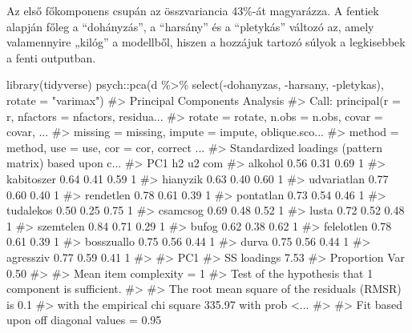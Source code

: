 \documentclass[
  letterpaper,
]{krantz}
\makeatletter
\newenvironment{Shaded}{\begin{snugshade}}{\end{snugshade}}
\newcommand{\AttributeTok}[1]{\textcolor[rgb]{0.40,0.45,0.13}{#1}}
\newcommand{\CommentTok}[1]{\textcolor[rgb]{0.37,0.37,0.37}{#1}}
\newcommand{\FunctionTok}[1]{\textcolor[rgb]{0.28,0.35,0.67}{#1}}
\newcommand{\NormalTok}[1]{\textcolor[rgb]{0.00,0.23,0.31}{#1}}
\newcommand{\SpecialCharTok}[1]{\textcolor[rgb]{0.37,0.37,0.37}{#1}}
\newcommand{\StringTok}[1]{\textcolor[rgb]{0.13,0.47,0.30}{#1}}
\newenvironment{kframe}{%
\medskip{}
\setlength{\fboxsep}{.8em}
 \def\at@end@of@kframe{}%
 \ifinner\ifhmode%
  \def\at@end@of@kframe{\end{minipage}}%
  \begin{minipage}{\columnwidth}%
 \fi\fi%
 \def\FrameCommand##1{\hskip\@totalleftmargin \hskip-\fboxsep
 \colorbox{shadecolor}{##1}\hskip-\fboxsep
     \hskip-\linewidth \hskip-\@totalleftmargin \hskip\columnwidth}%
 \MakeFramed {\advance\hsize-\width
   \@totalleftmargin\z@ \linewidth\hsize
   \@setminipage}}%
 {\par\unskip\endMakeFramed%
 \at@end@of@kframe}
\renewenvironment{Shaded}{\begin{kframe}}{\end{kframe}}
\makeatother
\begin{document}
Az első főkomponens csupán az összvariancia 43\%-át magyarázza. A
fentiek alapján főleg a ``dohányzás'', a ``harsány'' és a ``pletykás''
változó az, amely valamennyire „kilóg'' a modellből, hiszen a hozzájuk
tartozó súlyok a legkisebbek a fenti outputban.

\begin{Shaded}
\begin{Highlighting}[]
\FunctionTok{library}\NormalTok{(tidyverse)}
\NormalTok{psych}\SpecialCharTok{::}\FunctionTok{pca}\NormalTok{(d }\SpecialCharTok{\%\textgreater{}\%}
    \FunctionTok{select}\NormalTok{(}\SpecialCharTok{{-}}\NormalTok{dohanyzas, }\SpecialCharTok{{-}}\NormalTok{harsany, }\SpecialCharTok{{-}}\NormalTok{pletykas), }\AttributeTok{rotate =} \StringTok{"varimax"}\NormalTok{)}
\CommentTok{\#\textgreater{} Principal Components Analysis}
\CommentTok{\#\textgreater{} Call: principal(r = r, nfactors = nfactors, residua...}
\CommentTok{\#\textgreater{}     rotate = rotate, n.obs = n.obs, covar = covar, ...}
\CommentTok{\#\textgreater{}     missing = missing, impute = impute, oblique.sco...}
\CommentTok{\#\textgreater{}     method = method, use = use, cor = cor, correct ...}
\CommentTok{\#\textgreater{} Standardized loadings (pattern matrix) based upon c...}
\CommentTok{\#\textgreater{}              PC1   h2   u2 com}
\CommentTok{\#\textgreater{} alkohol     0.56 0.31 0.69   1}
\CommentTok{\#\textgreater{} kabitoszer  0.64 0.41 0.59   1}
\CommentTok{\#\textgreater{} hianyzik    0.63 0.40 0.60   1}
\CommentTok{\#\textgreater{} udvariatlan 0.77 0.60 0.40   1}
\CommentTok{\#\textgreater{} rendetlen   0.78 0.61 0.39   1}
\CommentTok{\#\textgreater{} pontatlan   0.73 0.54 0.46   1}
\CommentTok{\#\textgreater{} tudalekos   0.50 0.25 0.75   1}
\CommentTok{\#\textgreater{} csamcsog    0.69 0.48 0.52   1}
\CommentTok{\#\textgreater{} lusta       0.72 0.52 0.48   1}
\CommentTok{\#\textgreater{} szemtelen   0.84 0.71 0.29   1}
\CommentTok{\#\textgreater{} bufog       0.62 0.38 0.62   1}
\CommentTok{\#\textgreater{} felelotlen  0.78 0.61 0.39   1}
\CommentTok{\#\textgreater{} bosszuallo  0.75 0.56 0.44   1}
\CommentTok{\#\textgreater{} durva       0.75 0.56 0.44   1}
\CommentTok{\#\textgreater{} agressziv   0.77 0.59 0.41   1}
\CommentTok{\#\textgreater{} }
\CommentTok{\#\textgreater{}                 PC1}
\CommentTok{\#\textgreater{} SS loadings    7.53}
\CommentTok{\#\textgreater{} Proportion Var 0.50}
\CommentTok{\#\textgreater{} }
\CommentTok{\#\textgreater{} Mean item complexity =  1}
\CommentTok{\#\textgreater{} Test of the hypothesis that 1 component is sufficient.}
\CommentTok{\#\textgreater{} }
\CommentTok{\#\textgreater{} The root mean square of the residuals (RMSR) is  0.1 }
\CommentTok{\#\textgreater{}  with the empirical chi square  335.97  with prob \textless{}...}
\CommentTok{\#\textgreater{} }
\CommentTok{\#\textgreater{} Fit based upon off diagonal values = 0.95}
\end{Highlighting}
\end{Shaded}
\end{document}
